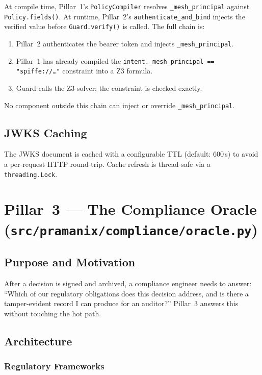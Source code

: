 \documentclass[12pt,a4paper,oneside]{report}
\newcommand{\fname}[1]{\texttt{#1}}          %
\newcommand{\code}[1]{\texttt{#1}}           %
\begin{document}
At compile time, Pillar~1's \code{PolicyCompiler} resolves
\code{\_mesh\_principal} against \code{Policy.fields()}.  At runtime,
Pillar~2's \code{authenticate\_and\_bind} injects the verified value before
\code{Guard.verify()} is called.  The full chain is:

\begin{enumerate}
  \item Pillar~2 authenticates the bearer token and injects
        \code{\_mesh\_principal}.
  \item Pillar~1 has already compiled the \code{intent.\_mesh\_principal ==
        "spiffe://\ldots"} constraint into a Z3 formula.
  \item Guard calls the Z3 solver; the constraint is checked exactly.
\end{enumerate}

No component outside this chain can inject or override \code{\_mesh\_principal}.

\subsection{JWKS Caching}

The JWKS document is cached with a configurable TTL (default: 600\,s) to
avoid a per-request HTTP round-trip.  Cache refresh is thread-safe via a
\code{threading.Lock}.

\section{Pillar~3 --- The Compliance Oracle
  (\fname{src/pramanix/compliance/oracle.py})}

\subsection{Purpose and Motivation}

After a decision is signed and archived, a compliance engineer needs to
answer: ``Which of our regulatory obligations does this decision address, and
is there a tamper-evident record I can produce for an auditor?''
Pillar~3 answers this without touching the hot path.

\subsection{Architecture}

\subsubsection{Regulatory Frameworks}
\end{document}
